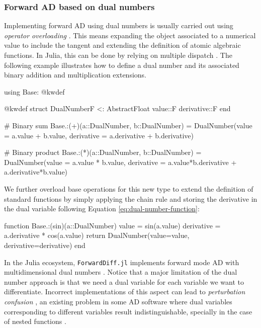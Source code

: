 \subsubsection{Forward AD based on dual numbers}
\label{section:software-Forward-AD}

Implementing forward AD using dual numbers is usually carried out using \textit{operator overloading} \cite{Neuenhofen_2018}. 
This means expanding the object associated to a numerical value to include the tangent and extending the definition of atomic algebraic functions. 
In Julia, this can be done by relying on multiple dispatch \cite{Julialang_2017}. 
The following example illustrates how to define a dual number and its associated binary addition and multiplication extensions. 
\begin{jllisting}
using Base: @kwdef

@kwdef struct DualNumber{F <: AbstractFloat}
    value::F
    derivative::F
end

# Binary sum
Base.:(+)(a::DualNumber, b::DualNumber) = DualNumber(value = a.value + b.value, derivative = a.derivative + b.derivative)

# Binary product 
Base.:(*)(a::DualNumber, b::DualNumber) = DualNumber(value = a.value * b.value, derivative = a.value*b.derivative + a.derivative*b.value)
\end{jllisting}
We further overload base operations for this new type to extend the definition of standard functions by simply applying the chain rule and storing the derivative in the dual variable following Equation \eqref{eq:dual-number-function}:
\begin{jllisting}
function Base.:(sin)(a::DualNumber)
    value = sin(a.value)
    derivative = a.derivative * cos(a.value)
    return DualNumber(value=value, derivative=derivative)
end
\end{jllisting}
In the Julia ecosystem, \texttt{ForwardDiff.jl} implements forward mode AD with multidimensional dual numbers \cite{RevelsLubinPapamarkou2016}. 
Notice that a major limitation of the dual number approach is that we need a dual variable for each variable we want to differentiate. 
Incorrect implementations of this aspect can lead to \textit{perturbation confusion} \cite{siskind2005perturbation, manzyuk2019perturbation}, an existing problem in some AD software where dual variables corresponding to different variables result indistinguishable, specially in the case of nested functions \cite{manzyuk2019perturbation}.   

